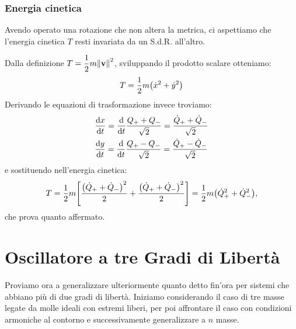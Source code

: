         \subsubsection{Energia cinetica}
            Avendo operato una rotazione che non altera la metrica, ci aspettiamo che l'energia cinetica $T$ resti invariata da un S.d.R. all'altro. \par Dalla definizione $\displaystyle T=\frac{1}{2}m\norm{\vb{v}}^2$, sviluppando il prodotto scalare otteniamo: $$T=\frac{1}{2}m\qty(\dot{x}^2+\dot{y}^2)$$ Derivando le equazioni di trasformazione invece troviamo:
            \begin{align*}
                &\dv{x}{t}=\dv{t}\frac{Q_++Q_-}{\sqrt{2}}=\frac{\dot{Q}_++\dot{Q}_-}{\sqrt{2}}\\
                &\dv{y}{t}=\dv{t}\frac{Q_+-Q_-}{\sqrt{2}}=\frac{\dot{Q}_+-\dot{Q}_-}{\sqrt{2}}
            \end{align*}
            e sostituendo nell'energia cinetica:
                $$T=\frac{1}{2}m\qty[\frac{\qty(\dot{Q}_++\dot{Q}_-)^2}{2}+\frac{\qty(\dot{Q}_++\dot{Q}_-)^2}{2}]=\frac{1}{2}m\qty(\dot{Q}_+^2+\dot{Q}_-^2),$$
            che prova quanto affermato.
\section{Oscillatore a tre Gradi di Libert\`a}
    Proviamo ora a generalizzare ulteriormente quanto detto fin'ora per sistemi che abbiano pi\`u di due gradi di libert\`a. Iniziamo considerando il caso di tre masse legate da molle ideali con estremi liberi, per poi affrontare il caso con condizioni armoniche al contorno e successivamente generalizzare a $n$ masse.
